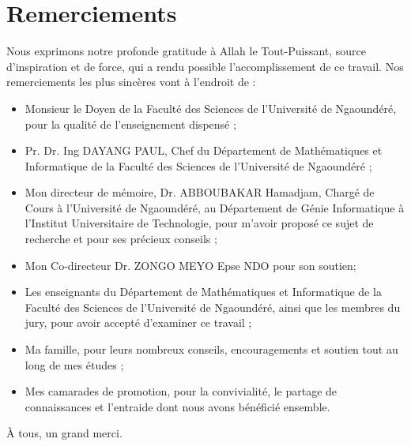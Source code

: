 \chapter*{Remerciements}

\renewcommand{\abstractnamefont}{\normalfont\Large\bfseries}


\hskip7mm
\begin{spacing}{1.3}
Nous exprimons notre profonde gratitude à Allah le Tout-Puissant, source d’inspiration et de force, qui a rendu possible l’accomplissement de ce travail. Nos remerciements les plus sincères vont à l’endroit de : 
\begin{itemize}
	\item Monsieur le Doyen de la Faculté des Sciences de l’Université de Ngaoundéré, pour la qualité de l’enseignement dispensé ;
    \item Pr. Dr. Ing DAYANG PAUL, Chef du Département de Mathématiques et Informatique de la Faculté des Sciences de l’Université de Ngaoundéré ;
    \item Mon directeur de mémoire, Dr. ABBOUBAKAR Hamadjam, Chargé de Cours à l’Université de Ngaoundéré, au Département de Génie Informatique à l’Institut Universitaire de Technologie, pour m'avoir proposé ce sujet de recherche et pour ses précieux conseils ;
    \item Mon Co-directeur Dr. ZONGO MEYO Epse NDO pour son soutien; 
    \item Les enseignants du Département de Mathématiques et Informatique de la Faculté des Sciences de l’Université de Ngaoundéré, ainsi que les membres du jury, pour avoir accepté d'examiner ce travail ;
    \item Ma famille, pour leurs nombreux conseils, encouragements et soutien tout au long de mes études ;
    \item Mes camarades de promotion, pour la convivialité, le partage de connaissances et l'entraide dont nous avons bénéficié ensemble.
\end{itemize}

À tous, un grand merci.
\end{spacing}
